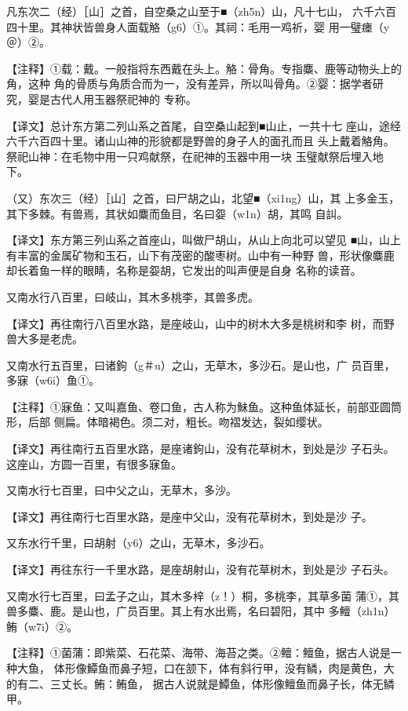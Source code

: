 \documentclass[a4paper,12pt,UTF8,twoside]{ctexbook}
\begin{document}
凡东次二（经）［山］之首，自空桑之山至于■（zh5n）山，凡十七山， 六千六百四十里。其神状皆兽身人面载觡（g6）①。其祠：毛用一鸡祈，婴 用一璧瘗（y＠）②。

【注释】①载：戴。一般指将东西戴在头上。觡：骨角。专指麋、鹿等动物头上的角，这种 角的骨质与角质合而为一，没有差异，所以叫骨角。②婴：据学者研究，婴是古代人用玉器祭祀神的 专称。

【译文】总计东方第二列山系之首尾，自空桑山起到■山止，一共十七 座山，途经六千六百四十里。诸山山神的形貌都是野兽的身子人的面孔而且 头上戴着觡角。祭祀山神：在毛物中用一只鸡献祭，在祀神的玉器中用一块 玉璧献祭后埋入地下。

（又）东次三（经）［山］之首，曰尸胡之山，北望■（xi1ng）山，其 上多金玉，其下多棘。有兽焉，其状如麋而鱼目，名曰妴（w1n）胡，其鸣 自訆。

【译文】东方第三列山系之首座山，叫做尸胡山，从山上向北可以望见 ■山，山上有丰富的金属矿物和玉石，山下有茂密的酸枣树。山中有一种野 兽，形状像麋鹿却长着鱼一样的眼睛，名称是妴胡，它发出的叫声便是自身 名称的读音。

又南水行八百里，曰岐山，其木多桃李，其兽多虎。

【译文】再往南行八百里水路，是座岐山，山中的树木大多是桃树和李 树，而野兽大多是老虎。

又南水行五百里，曰诸鉤（g＃u）之山，无草木，多沙石。是山也，广 员百里，多寐（w6i）鱼①。

【注释】①寐鱼：又叫嘉鱼、卷口鱼，古人称为鮇鱼。这种鱼体延长，前部亚圆筒形，后部 侧扁。体暗褐色。须二对，粗长。吻褶发达，裂如缨状。

【译文】再往南行五百里水路，是座诸鉤山，没有花草树木，到处是沙 子石头。这座山，方圆一百里，有很多寐鱼。

又南水行七百里，曰中父之山，无草木，多沙。

【译文】再往南行七百里水路，是座中父山，没有花草树木，到处是沙 子。

又东水行千里，曰胡射（y6）之山，无草木，多沙石。

【译文】再往东行一千里水路，是座胡射山，没有花草树木，到处是沙 子石头。

又南水行七百里，曰孟子之山，其木多梓（z！）桐，多桃李，其草多菌 蒲①，其兽多麋、鹿。是山也，广员百里。其上有水出焉，名曰碧阳，其中 多鳣（zh1n）鲔（w7i）②。

【注释】①菌蒲：即紫菜、石花菜、海带、海苔之类。②鳣：鳣鱼，据古人说是一种大鱼， 体形像鱏鱼而鼻子短，口在颔下，体有斜行甲，没有鳞，肉是黄色，大的有二、三丈长。鲔：鲔鱼， 据古人说就是鱏鱼，体形像鳣鱼而鼻子长，体无鳞甲。
\end{document}
